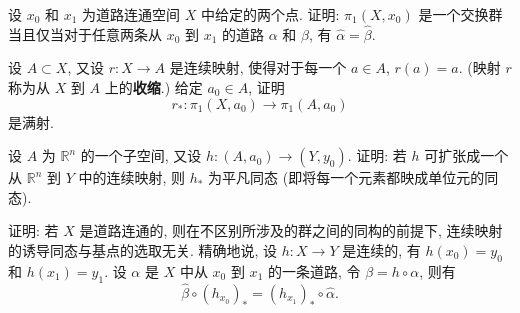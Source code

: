 \begin{exercise}
设 $x_0$ 和 $x_1$ 为道路连通空间 $X$ 中给定的两个点. 证明: $\pi_1(X,x_0)$ 是一个交换群当且仅当对于任意两条从 $x_0$ 到 $x_1$ 的道路 $\alpha$ 和 $\beta$, 有 $\hat{\alpha}=\hat{\beta}$.
\end{exercise}

\begin{exercise}
设 $A\subset X$, 又设 $r\colon X\to A$ 是连续映射, 使得对于每一个 $a\in A$, $r(a)=a$. (映射 $r$ 称为从 $X$ 到 $A$ 上的\textbf{收缩}.) 给定 $a_0\in A$, 证明
\[
r_{*}\colon\pi_{1}(X,a_{0})\longrightarrow\pi_{1}(A,a_{0})
\]
是满射.
\end{exercise}

\begin{exercise}
设 $A$ 为 $\mathbb{R}^{n}$ 的一个子空间, 又设 $h\colon(A,a_0)\to(Y,y_0)$. 证明: 若 $h$ 可扩张成一个从 $\mathbb{R}^{n}$ 到 $Y$ 中的连续映射, 则 $h_*$ 为平凡同态 (即将每一个元素都映成单位元的同态).
\end{exercise}

\begin{exercise}
证明: 若 $X$ 是道路连通的, 则在不区别所涉及的群之间的同构的前提下, 连续映射的诱导同态与基点的选取无关. 精确地说, 设 $h\colon X\to Y$ 是连续的, 有 $h(x_0)=y_0$ 和 $h(x_1)=y_1$. 设 $\alpha$ 是 $X$ 中从 $x_0$ 到 $x_1$ 的一条道路, 令 $\beta=h\circ\alpha$, 则有
\[
\hat{\beta}\circ(h_{x_{0}})_{*}=(h_{x_{1}})_{*}\circ\hat{\alpha}.
\]
\end{exercise}

